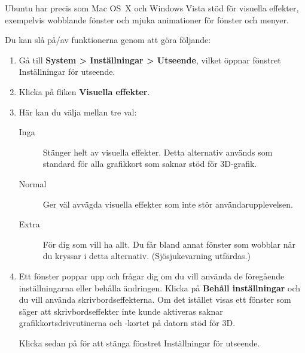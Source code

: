 \documentclass[a4paper,final]{memoir} %
\begin{document}
Ubuntu har precis som Mac OS~X och Windows Vista stöd för visuella effekter, exempelvis wobblande fönster och mjuka animationer för fönster och menyer.


Du kan slå på/av funktionerna genom att göra följande:

\begin{enumerate}

\item Gå till \textbf{System \textgreater{} Inställningar \textgreater{} Utseende}, vilket öppnar fönstret Inställningar för utseende. 

\item Klicka på fliken \textbf{Visuella effekter}. 

\item Här kan du välja mellan tre val:

\begin{description}

\item[Inga] Stänger helt av visuella effekter. Detta alternativ används som standard för alla grafikkort som saknar stöd för 3D-grafik.

\item[Normal] Ger väl avvägda visuella effekter som inte stör användarupplevelsen.

\item[Extra] För dig som vill ha allt. Du får bland annat fönster som wobblar när du kryssar i detta alternativ. (Sjösjukevarning utfärdas.)

\end{description}

\item Ett fönster poppar upp och frågar dig om du vill använda de föregående inställningarna eller behålla ändringen. Klicka på \textbf{Behåll inställningar} och du vill använda skrivbordseffekterna. Om det istället visas ett fönster som säger att skrivbordseffekter inte kunde aktiveras saknar grafikkortsdrivrutinerna och -kortet på datorn stöd för 3D.


Klicka sedan på \xstang{} för att stänga fönstret Inställningar för utseende.

\end{enumerate}
\end{document}
